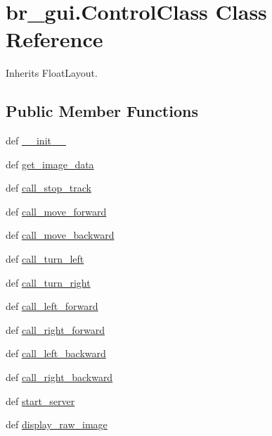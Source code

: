 \hypertarget{classbr__gui_1_1ControlClass}{\section{br\-\_\-gui.\-Control\-Class Class Reference}
\label{classbr__gui_1_1ControlClass}
}


Inherits Float\-Layout.

\subsection*{Public Member Functions}
\begin{DoxyCompactItemize}
\item 
def \hyperlink{classbr__gui_1_1ControlClass_ad82367f9d952522a8d5157da50daed58}{\-\_\-\-\_\-init\-\_\-\-\_\-}
\item 
def \hyperlink{classbr__gui_1_1ControlClass_a511aa32647284cb536b7ac1d0fdf0aa7}{get\-\_\-image\-\_\-data}
\item 
def \hyperlink{classbr__gui_1_1ControlClass_ac9eba78d41f238b3c0d541e2481500e9}{call\-\_\-stop\-\_\-track}
\item 
def \hyperlink{classbr__gui_1_1ControlClass_a220bb2d81baeb5eca90e029ce14fed89}{call\-\_\-move\-\_\-forward}
\item 
def \hyperlink{classbr__gui_1_1ControlClass_ab0088aff9d55ee04bfaa1ac42b81f30b}{call\-\_\-move\-\_\-backward}
\item 
def \hyperlink{classbr__gui_1_1ControlClass_a30d33c0775ea983abae8657758902f48}{call\-\_\-turn\-\_\-left}
\item 
def \hyperlink{classbr__gui_1_1ControlClass_aa9bceb8a0bc7882e41a4932286304adf}{call\-\_\-turn\-\_\-right}
\item 
def \hyperlink{classbr__gui_1_1ControlClass_a60ff3a6d24d1bf49a2f120e90322c3cd}{call\-\_\-left\-\_\-forward}
\item 
def \hyperlink{classbr__gui_1_1ControlClass_a5690a2b2cb58655b04bba39c258bb9be}{call\-\_\-right\-\_\-forward}
\item 
def \hyperlink{classbr__gui_1_1ControlClass_a6d2590581d1f32440f47d95fe24695e3}{call\-\_\-left\-\_\-backward}
\item 
def \hyperlink{classbr__gui_1_1ControlClass_abd74e10882faa0229539960a3f6ae6ed}{call\-\_\-right\-\_\-backward}
\item 
def \hyperlink{classbr__gui_1_1ControlClass_a18fc025ee9e85c3a4d1b3a89c4ce8713}{start\-\_\-server}
\item 
def \hyperlink{classbr__gui_1_1ControlClass_a0faee8cb3765e46f52f41e8bd678c0f0}{display\-\_\-raw\-\_\-image}
\end{DoxyCompactItemize}


